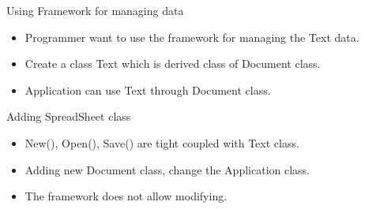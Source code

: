 \documentclass[13pt]{beamer}
\begin{document}
\begin{frame}{Using Framework for managing data}
\begin{itemize}
	\setlength\itemsep{1em}
	\item Programmer want to use the framework for managing the Text data.
	\item Create a class Text which is derived class of Document class.
	\item Application can use Text through Document class.
\end{itemize}
\begin{center}
\end{center}
\end{frame}

\begin{frame}{Adding SpreadSheet class}
\begin{itemize}
	\setlength\itemsep{1em}
	\item New(), Open(), Save() are tight coupled with Text class.
	\item Adding new Document class, change the Application class.
	\item The framework does not allow modifying.
\end{itemize}
\begin{center}
\end{center}
\end{frame}
\end{document}

